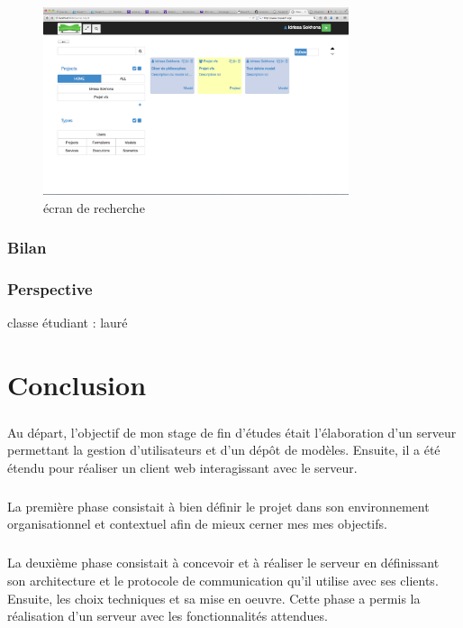 \documentclass{report}
\begin{document}
\newpage

\begin{figure}[h!]
     \centering
     \includegraphics[width=0.8\textwidth] {img/1-ecran-recherche}
     \caption{écran de recherche}
\end{figure}







\subsection{Bilan}
\subsection{Perspective}
classe étudiant : lauré
\chapter*{Conclusion}

\paragraph{}
Au départ, l'objectif de mon stage de fin d'études était l'élaboration d'un serveur permettant la gestion d'utilisateurs et d'un dépôt de modèles. Ensuite, il a été étendu pour réaliser un client web interagissant avec le serveur.

\paragraph{}
La première phase consistait à bien définir le projet dans son environnement organisationnel et contextuel afin de mieux cerner mes
mes objectifs.

\paragraph{}
La deuxième phase consistait à concevoir et à réaliser le serveur en définissant son architecture et le protocole de communication
qu'il utilise avec ses clients. Ensuite, les choix techniques et sa mise en oeuvre. Cette phase a permis la réalisation d'un serveur
avec les fonctionnalités attendues.
\end{document}

